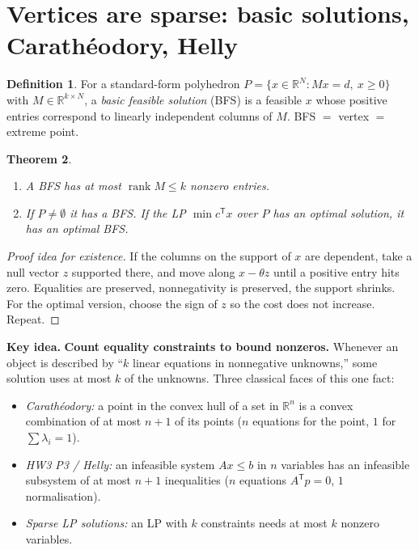 \documentclass[11pt]{article}
\newenvironment{keyidea}{\begin{shaded}\noindent\textbf{Key idea.} }{\end{shaded}}
\newcommand{\R}{\mathbb{R}}
\newcommand{\T}{^{\mathsf T}}
\theoremstyle{definition}
\newtheorem{definition}{Definition}[section]
\theoremstyle{plain}
\newtheorem{theorem}[definition]{Theorem}
\theoremstyle{remark}
\begin{document}
\section{Vertices are sparse: basic solutions, Carath\'eodory, Helly}
\begin{definition}
For a standard-form polyhedron $P=\{x\in\R^N:Mx=d,\ x\ge0\}$ with $M\in\R^{k\times N}$, a \emph{basic feasible solution} (BFS) is a feasible $x$ whose positive entries correspond to linearly independent columns of $M$. BFS $=$ vertex $=$ extreme point.
\end{definition}
\begin{theorem}\leavevmode
\begin{enumerate}
\item A BFS has at most $\operatorname{rank}M\le k$ nonzero entries.
\item If $P\neq\emptyset$ it has a BFS. If the LP $\min c\T x$ over $P$ has an optimal solution, it has an optimal BFS.
\end{enumerate}
\end{theorem}
\begin{proof}[Proof idea for existence]
If the columns on the support of $x$ are dependent, take a null vector $z$ supported there, and move along $x-\theta z$ until a positive entry hits zero. Equalities are preserved, nonnegativity is preserved, the support shrinks. For the optimal version, choose the sign of $z$ so the cost does not increase. Repeat.
\end{proof}
\begin{keyidea}
\textbf{Count equality constraints to bound nonzeros.} Whenever an object is described by ``$k$ linear equations in nonnegative unknowns,'' some solution uses at most $k$ of the unknowns. Three classical faces of this one fact:
\begin{itemize}
\item \emph{Carath\'eodory:} a point in the convex hull of a set in $\R^n$ is a convex combination of at most $n+1$ of its points ($n$ equations for the point, $1$ for $\sum\lambda_i=1$).
\item \emph{HW3 P3 / Helly:} an infeasible system $Ax\le b$ in $n$ variables has an infeasible subsystem of at most $n+1$ inequalities ($n$ equations $A\T p=0$, $1$ normalisation).
\item \emph{Sparse LP solutions:} an LP with $k$ constraints needs at most $k$ nonzero variables.
\end{itemize}
\end{keyidea}
\end{document}
